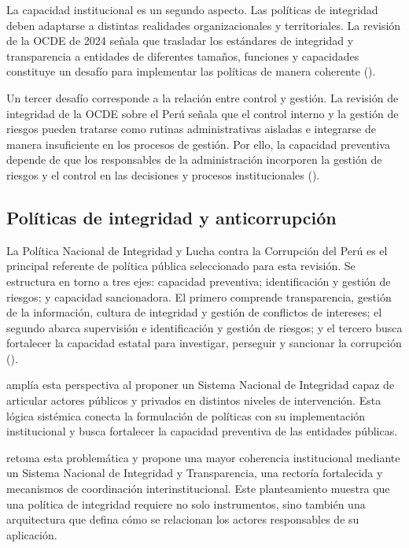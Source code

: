 \documentclass[Afour,sageh,times]{sagej}
\begin{document}
La capacidad institucional es un segundo aspecto. Las políticas de integridad deben adaptarse a distintas realidades organizacionales y territoriales. La revisión de la OCDE de 2024 señala que trasladar los estándares de integridad y transparencia a entidades de diferentes tamaños, funciones y capacidades constituye un desafío para implementar las políticas de manera coherente (\citealp{oecd2024sistema}).

Un tercer desafío corresponde a la relación entre control y gestión. La revisión de integridad de la OCDE sobre el Perú señala que el control interno y la gestión de riesgos pueden tratarse como rutinas administrativas aisladas e integrarse de manera insuficiente en los procesos de gestión. Por ello, la capacidad preventiva depende de que los responsables de la administración incorporen la gestión de riesgos y el control en las decisiones y procesos institucionales (\citealp{oecd2017integrity}).

\subsection{Políticas de integridad y anticorrupción}
La Política Nacional de Integridad y Lucha contra la Corrupción del Perú es el principal referente de política pública seleccionado para esta revisión. Se estructura en torno a tres ejes: capacidad preventiva; identificación y gestión de riesgos; y capacidad sancionadora. El primero comprende transparencia, gestión de la información, cultura de integridad y gestión de conflictos de intereses; el segundo abarca supervisión e identificación y gestión de riesgos; y el tercero busca fortalecer la capacidad estatal para investigar, perseguir y sancionar la corrupción (\citealp{pcm2017politica}).

\citet{munive2022integridad} amplía esta perspectiva al proponer un Sistema Nacional de Integridad capaz de articular actores públicos y privados en distintos niveles de intervención. Esta lógica sistémica conecta la formulación de políticas con su implementación institucional y busca fortalecer la capacidad preventiva de las entidades públicas.

\citet{oecd2024sistema} retoma esta problemática y propone una mayor coherencia institucional mediante un Sistema Nacional de Integridad y Transparencia, una rectoría fortalecida y mecanismos de coordinación interinstitucional. Este planteamiento muestra que una política de integridad requiere no solo instrumentos, sino también una arquitectura que defina cómo se relacionan los actores responsables de su aplicación.
\end{document}
